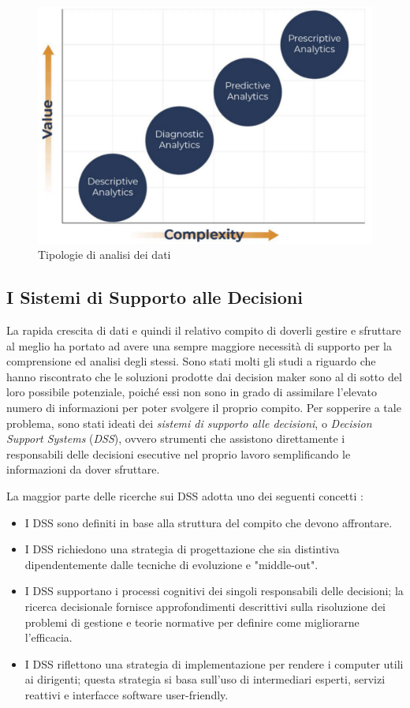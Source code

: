 \begin{figure}[H]
    \centering
    \includegraphics[width=0.75\linewidth]{figure/capitolo_2/Analytics Models.pdf}
    \caption{Tipologie di analisi dei dati}
    \label{fig:Analytics Models}
\end{figure}

\subsection{I Sistemi di Supporto alle Decisioni}

La rapida crescita di dati e quindi il relativo compito di doverli gestire e sfruttare al meglio ha portato ad avere una sempre maggiore necessità di supporto per la comprensione ed analisi degli stessi. Sono stati molti gli studi a riguardo che hanno riscontrato che le soluzioni prodotte dai decision maker sono al di sotto del loro possibile potenziale, poiché essi non sono in grado di assimilare l'elevato numero di informazioni per poter svolgere il proprio compito. Per sopperire a tale problema, sono stati ideati dei \textit{sistemi di supporto alle decisioni}, o \textit{Decision Support Systems} (\textit{DSS}), ovvero strumenti che assistono direttamente i responsabili delle decisioni esecutive nel proprio lavoro semplificando le informazioni da dover sfruttare.\cite{dss_introduction}

La maggior parte delle ricerche sui DSS adotta uno dei seguenti concetti \cite{mit_keen_dss}:

\begin{itemize}
    \item I DSS sono definiti in base alla struttura del compito che devono affrontare.
    \item I DSS richiedono una strategia di progettazione che sia distintiva dipendentemente dalle tecniche di evoluzione e "middle-out".
    \item I DSS supportano i processi cognitivi dei singoli responsabili delle decisioni; la ricerca decisionale fornisce approfondimenti descrittivi sulla risoluzione dei problemi di gestione e teorie normative per definire come migliorarne l'efficacia.
    \item I DSS riflettono una strategia di implementazione per rendere i computer utili ai dirigenti; questa strategia si basa sull'uso di intermediari esperti, servizi reattivi e interfacce software user-friendly.
\end{itemize}

